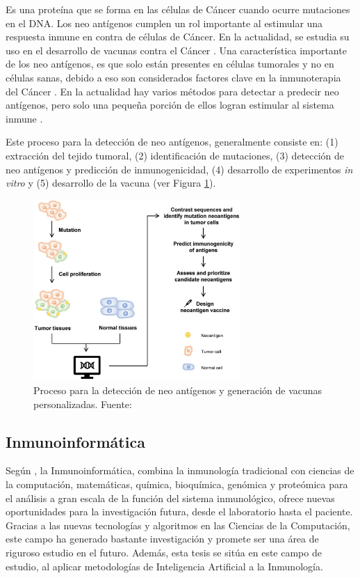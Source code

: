 Es una proteína que se forma en las células de Cáncer cuando ocurre mutaciones en el DNA. Los neo antígenos cumplen un rol importante al estimular una respuesta inmune en contra de células de Cáncer. En la actualidad, se estudia su uso en el desarrollo de vacunas contra el Cáncer \cite{NCIdictionary2022}. Una característica importante de los neo antígenos, es que solo están presentes en células tumorales y no en células sanas, debido a eso son considerados factores clave en la inmunoterapia del Cáncer \cite{borden2022cancer}. En la actualidad hay varios métodos para detectar a predecir neo antígenos, pero solo una pequeña porción de ellos logran estimular al sistema inmune \cite{chen2021challenges, hao2021improvement}.

 Este proceso para la detección de neo antígenos, generalmente consiste en: (1) extracción del tejido tumoral, (2) identificación de mutaciones, (3) detección de neo antígenos y predicción de inmunogenicidad, (4) desarrollo de experimentos \textit{in vitro} y (5) desarrollo de la vacuna \citep{de2020neoantigen, peng2019neoantigen} (ver Figura \ref{fig:process}). 

\begin{figure}[H]
	\centering
	\includegraphics[width=0.7\textwidth]{../img/neoantigen/process}	
	\caption{Proceso para la detección de neo antígenos y generación de vacunas personalizadas. Fuente: \citep{de2020neoantigen} }
	\label{fig:process}
\end{figure}


\subsection{Inmunoinformática}

Según \cite{tong2009immunoinformatics}, la Inmunoinformática,  combina la inmunología tradicional con ciencias de la computación, matemáticas, química, bioquímica, genómica y proteómica para el análisis a gran escala de la función del sistema inmunológico, ofrece nuevas oportunidades para la investigación futura, desde el laboratorio hasta el paciente. Gracias a las nuevas tecnologías y algoritmos en las Ciencias de la Computación, este campo ha generado bastante investigación y promete ser una área de riguroso estudio en el futuro. Además, esta tesis se sitúa en este campo de estudio, al aplicar metodologías de Inteligencia Artificial a la Inmunología.

